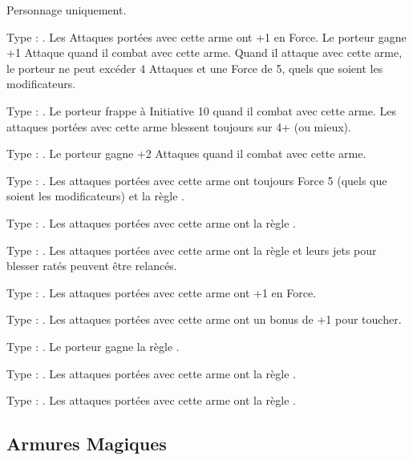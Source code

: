Personnage uniquement.

Type : \hw{}. Les Attaques portées avec cette arme ont +1 en Force. Le porteur gagne +1 Attaque quand il combat avec cette arme. Quand il attaque avec cette arme, le porteur ne peut excéder 4 Attaques et une Force de 5, quels que soient les modificateurs.

Type : \hw{}. Le porteur frappe à Initiative 10 quand il combat avec cette arme. Les attaques portées avec cette arme blessent toujours sur 4+ (ou mieux).

\columnbreak

Type : \hw{}. Le porteur gagne +2 Attaques quand il combat avec cette arme.

Type : \halberd{}. Les attaques portées avec cette arme ont toujours Force 5 (quels que soient les modificateurs) et la règle .

Type : \gw{}. Les attaques portées avec cette arme ont la règle .

Type : \hw{}. Les attaques portées avec cette arme ont la règle \divineattacks{} et leurs jets pour blesser ratés peuvent être relancés.

Type : \hw{}. Les attaques portées avec cette arme ont +1 en Force.

Type : \hw{}. Les attaques portées avec cette arme ont un bonus de +1 pour toucher.

Type : \pw{}. Le porteur gagne la règle \fear{}.

Type : \lance{}. Les attaques portées avec cette arme ont la règle \flamingattacks{}.

Type : \hw{}. Les attaques portées avec cette arme ont la règle .

\endpricelist

\newpage
\hypertarget{magicalarmour}{\subsection{Armures Magiques}}
\label{magical_armour}

